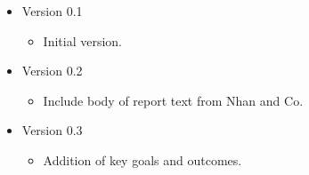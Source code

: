 \documentclass[11pt,letterpaper,fleqn]{article}
\begin{document}
\vspace{8pt}
\begin{itemize}
  \item Version 0.1
  \vspace{-5pt}
  \begin{itemize}
    \item Initial version.
  \end{itemize}
  \item Version 0.2
  \vspace{-5pt}
  \begin{itemize}
    \item Include body of report text from Nhan and Co.
  \end{itemize}
  \item Version 0.3
  \vspace{-5pt}
  \begin{itemize}
    \item Addition of key goals and outcomes.
  \end{itemize}
\end{itemize}
\end{document}
